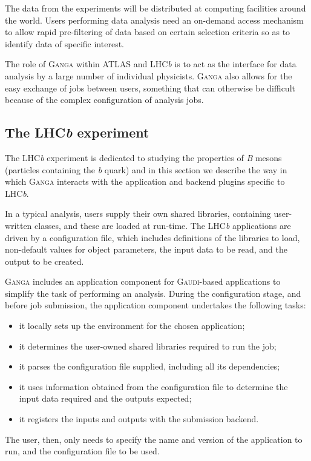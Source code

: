 \documentclass{elsart}
\def\lhcb {LHC{\em b\/}\xspace}
\def\atlas {ATLAS\xspace}
\def\ganga {\textsc{Ganga}\xspace}
\def\gaudi {\textsc{Gaudi}\xspace}
\begin{document}
\begin{linenumbers}
The data from the experiments will be distributed at computing facilities
around the world. Users performing data analysis need an on-demand access
mechanism to allow rapid pre-filtering of data based on certain selection
criteria so as to identify data of specific interest.

The role of \ganga within \atlas and \lhcb is to act as the interface for data
analysis by a large number of individual physicists. \ganga also allows for
the easy exchange of jobs between users, something that can otherwise be difficult
because of the complex configuration of analysis jobs.

\subsection{The \lhcb experiment}
\label{sec:lhcb}

The \lhcb experiment is dedicated to studying the properties of \textit{B}
mesons (particles containing the \textit{b} quark) and in this section we
describe the way in which \ganga interacts with the application and
backend plugins specific to \lhcb.

In a typical analysis, users supply their own shared libraries, containing
user-written classes, and these are loaded at run-time. 
The \lhcb applications are driven by a configuration file,
which includes definitions of the libraries to load, non-default values for
object parameters, the input data to be read, and the output to be created.

\ganga includes an application component for \gaudi-based applications to simplify
the task of performing an analysis. During the configuration stage, and before
job submission, the application component undertakes the following tasks:
\begin{itemize}
\item it locally sets up the environment for the chosen application;
\item it determines the user-owned shared libraries required to
  run the job;
\item it parses the configuration file supplied, including all its dependencies;
\item it uses information obtained from the configuration file to determine
  the input data required and the outputs expected;
\item it registers the inputs and outputs with the submission backend.
\end{itemize}
The user, then, only needs to specify the name and
version of the application to run, and the configuration file to be used.


\end{linenumbers}
\end{document}

